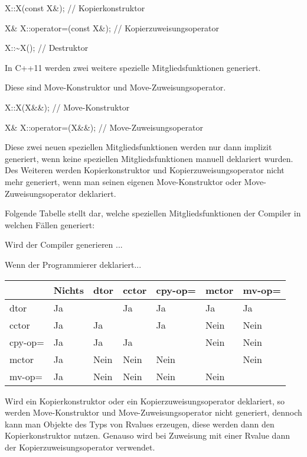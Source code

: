 \documentclass{article}
\begin{document}
X::X(const X\&);            // Kopierkonstruktor

X\& X::operator=(const X\&); // Kopierzuweisungsoperator

X::\textasciitilde{}X();                   // Destruktor

\vspace{12pt}
In C++11 werden zwei weitere spezielle Mitgliedsfunktionen generiert.

Diese sind Move-Konstruktor und Move-Zuweisungsoperator.

X::X(X\&\&);            // Move-Konstruktor

X\& X::operator=(X\&\&); // Move-Zuweisungsoperator

\vspace{12pt}
Diese zwei neuen speziellen Mitgliedsfunktionen werden nur dann implizit generiert, 
wenn keine speziellen Mitgliedsfunktionen manuell deklariert wurden. Des Weiteren 
werden Kopierkonstruktor und Kopierzuweisungsoperator nicht mehr generiert, wenn 
man seinen eigenen Move-Konstruktor oder Move-Zuweisungsoperator deklariert.

Folgende Tabelle stellt dar, welche speziellen Mitgliedsfunktionen der Compiler 
in welchen Fällen generiert:

Wird der Compiler generieren ...                        

\parindent=122pt
Wenn der Programmierer deklariert...

\parindent=0pt
\begin{tabular}{|>{\raggedright}p{8pt}|>{\raggedright}p{28pt}|>{\raggedright}p{28pt}|>{\raggedright}p{28pt}|>{\raggedright}p{28pt}|>{\raggedright}p{28pt}|>{\raggedright}p{28pt}|}
\hline
 & Nichts & dtor & cctor & cpy-op= & mctor & mv-op=\tabularnewline
\hline
dtor & Ja &  & Ja & Ja & Ja & Ja\tabularnewline
\hline
cctor & Ja & Ja &  & Ja & Nein & Nein\tabularnewline
\hline
cpy-op= & Ja & Ja & Ja &  & Nein & Nein\tabularnewline
\hline
mctor & Ja & Nein & Nein & Nein &  & Nein\tabularnewline
\hline
mv-op= & Ja & Nein & Nein & Nein & Nein & \tabularnewline
\hline
\end{tabular}

\vspace{220pt}
Wird ein Kopierkonstruktor oder ein Kopierzuweisungsoperator deklariert, so werden 
Move-Konstruktor und Move-Zuweisungsoperator nicht generiert, dennoch kann man 
Objekte des Typs von Rvalues erzeugen, diese werden dann den Kopierkonstruktor 
nutzen. Genauso wird bei Zuweisung mit einer Rvalue dann der Kopierzuweisungsoperator 
verwendet.
\end{document}
